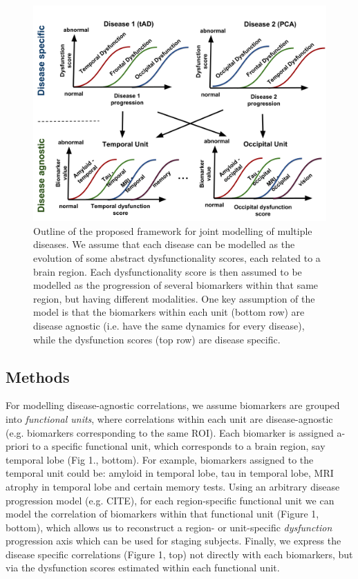 \documentclass{llncs}
\begin{document}
\begin{figure}[h]
 \centering
 \includegraphics[width=\textwidth]{figures/disease_knowledge_transfer.png}
 \caption{Outline of the proposed framework for joint modelling of multiple diseases. We assume that each disease can be modelled as the evolution of some abstract dysfunctionality scores, each related to a brain region. Each dysfunctionality score is then assumed to be modelled as the progression of several biomarkers within that same region, but having different modalities. One key assumption of the model is that the biomarkers within each unit (bottom row) are disease agnostic (i.e. have the same dynamics for every disease), while the dysfunction scores (top row) are disease specific.}
\end{figure}

\subsection{Methods}
For modelling disease-agnostic correlations, we assume biomarkers are grouped into \emph{functional units}, where correlations within each unit are disease-agnostic (e.g. biomarkers corresponding to the same ROI).  Each biomarker is assigned a-priori to a specific functional unit, which corresponds to a brain region, say temporal lobe (Fig 1., bottom).  For example, biomarkers assigned to the temporal unit could be: amyloid in temporal lobe, tau in temporal lobe, MRI atrophy in temporal lobe and certain memory tests. Using an arbitrary disease progression model (e.g. CITE), for each region-specific functional unit we can model the correlation of biomarkers within that functional unit (Figure 1, bottom), which allows us to reconstruct a region- or unit-specific \emph{dysfunction} progression axis which can be used for staging subjects. Finally, we express the disease specific correlations (Figure 1, top) not directly with each biomarkers, but via the dysfunction scores estimated within each functional unit.  
\end{document}
